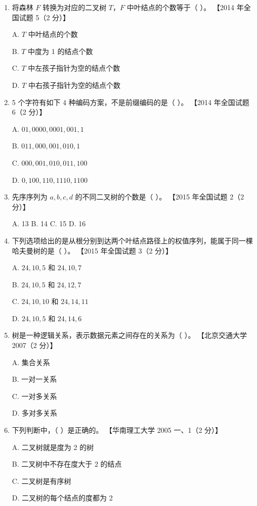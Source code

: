 \documentclass[lang=cn,newtx,10pt,scheme=chinese]{../../elegantbook}
\begin{document}
\begin{enumerate}
    \item 将森林 $F$ 转换为对应的二叉树 $T$，$F$ 中叶结点的个数等于（ ）。  
    【2014 年全国试题 5（2 分）】  

    A. $T$ 中叶结点的个数  

    B. $T$ 中度为 1 的结点个数  

    C. $T$ 中左孩子指针为空的结点个数  

    D. $T$ 中右孩子指针为空的结点个数  

    \item 5 个字符有如下 4 种编码方案，不是前缀编码的是（ ）。  
    【2014 年全国试题 6（2 分）】  

    A. $01, 0000, 0001, 001, 1$  

    B. $011, 000, 001, 010, 1$ 

    C. $000, 001, 010, 011, 100$  

    D. $0, 100, 110, 1110, 1100$  

    \item 先序序列为 $a, b, c, d$ 的不同二叉树的个数是（ ）。  
    【2015 年全国试题 2（2 分）】 

    A. 13 \quad B. 14 \quad C. 15 \quad D. 16  

    \item 下列选项给出的是从根分别到达两个叶结点路径上的权值序列，能属于同一棵哈夫曼树的是（ ）。  
    【2015 年全国试题 3（2 分）】  

    A. $24, 10, 5$ 和 $24, 10, 7$

    B. $24, 10, 5$ 和 $24, 12, 7$  

    C. $24, 10, 10$ 和 $24, 14, 11$  

    D. $24, 10, 5$ 和 $24, 14, 6$  

    \item 树是一种逻辑关系，表示数据元素之间存在的关系为（ ）。  
    【北京交通大学 2007（2 分）】  

    A. 集合关系  

    B. 一对一关系  

    C. 一对多关系  

    D. 多对多关系  

    \item 下列判断中，（ ）是正确的。  
    【华南理工大学 2005 一、1（2 分）】  

    A. 二叉树就是度为 2 的树  

    B. 二叉树中不存在度大于 2 的结点  

    C. 二叉树是有序树  

    D. 二叉树的每个结点的度都为 2  


\end{enumerate}
\end{document}
